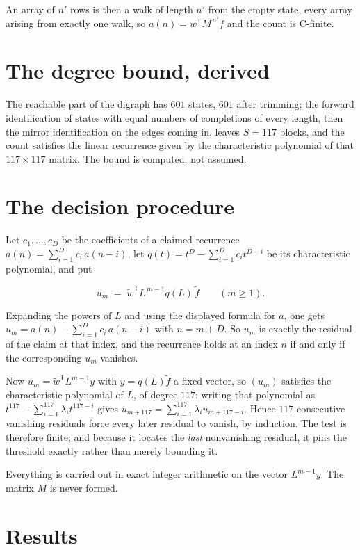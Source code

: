 \documentclass[11pt]{article}
\theoremstyle{definition}
\begin{document}
An array of $n'$ rows is then a walk of length $n'$ from the empty state, every array arising from exactly one walk, so $a(n) = w^{\mathsf T}M^{\,n'}f$ and the count is C-finite.

\section{The degree bound, derived}

The reachable part of the digraph has $601$ states, $601$ after trimming; the forward identification of states with equal numbers of completions of every length, then the mirror identification on the edges coming in, leaves $S = 117$ blocks, and the count satisfies the linear recurrence given by the characteristic polynomial of that $117\times117$ matrix. The bound is computed, not assumed.

\section{The decision procedure}

Let $c_1,\dots,c_D$ be the coefficients of a claimed recurrence $a(n) = \sum_{i=1}^{D} c_i\,a(n-i)$, let $q(t) = t^{D} - \sum_{i=1}^{D} c_i t^{D-i}$ be its characteristic polynomial, and put

\[u_m \;=\; \tilde w^{\mathsf T} L^{\,m-1} q(L)\,\tilde f \qquad (m \ge 1).\]

Expanding the powers of $L$ and using the displayed formula for $a$, one gets $u_m = a(n) - \sum_{i=1}^{D} c_i\,a(n-i)$ with $n = m + D$. So $u_m$ is exactly the residual of the claim at that index, and the recurrence holds at an index $n$ if and only if the corresponding $u_m$ vanishes.

Now $u_m = \tilde w^{\mathsf T} L^{m-1} y$ with $y = q(L)\tilde f$ a fixed vector, so $(u_m)$ satisfies the characteristic polynomial of $L$, of degree $117$: writing that polynomial as $t^{117} - \sum_{i=1}^{117} \lambda_i t^{117-i}$ gives $u_{m+117} = \sum_{i=1}^{117} \lambda_i u_{m+117-i}$. Hence $117$ consecutive vanishing residuals force every later residual to vanish, by induction. The test is therefore finite; and because it locates the {\itshape last} nonvanishing residual, it pins the threshold exactly rather than merely bounding it.

Everything is carried out in exact integer arithmetic on the vector $L^{m-1}y$. The matrix $M$ is never formed.

\section{Results}
\end{document}

